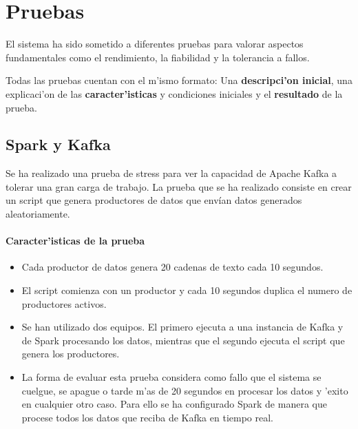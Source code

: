 
\chapter{Pruebas}\label{cap8}

El sistema ha sido sometido a diferentes pruebas para valorar aspectos fundamentales como el rendimiento, la fiabilidad y la tolerancia a fallos.

Todas las pruebas cuentan con el m'ismo formato: Una \textbf{descripci'on inicial}, una explicaci'on de las \textbf{caracter'isticas} y condiciones iniciales y el \textbf{resultado} de la prueba.


\section{Spark y Kafka}\label{sec:pruebasparkkafka}

Se ha realizado una prueba de stress para ver la capacidad de Apache Kafka a tolerar una gran carga de trabajo. La prueba que se ha realizado consiste en crear un script que genera productores de datos que envían datos generados aleatoriamente.

\subsubsection*{Caracter'isticas de la prueba}

\begin{itemize}
\item Cada productor de datos genera 20 cadenas de texto cada 10 segundos.

\item El script comienza con un productor y cada 10 segundos duplica el numero de productores activos.

\item Se han utilizado dos equipos. El primero ejecuta a una instancia de Kafka y de Spark procesando los datos, mientras que el segundo ejecuta el script que genera los productores.

\item La forma de evaluar esta prueba considera como fallo que el sistema se cuelgue, se apague o tarde m'as de 20 segundos en procesar los datos y 'exito en cualquier otro caso. Para ello se ha configurado Spark de manera que procese todos los datos que reciba de Kafka en tiempo real.

\end{itemize}


